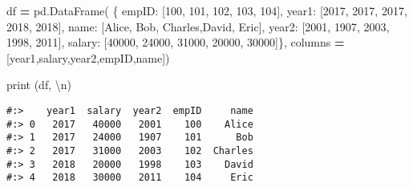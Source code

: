 \documentclass[
]{book}
\newenvironment{Shaded}{\begin{snugshade}}{\end{snugshade}}
\newcommand{\BuiltInTok}[1]{#1}
\newcommand{\CharTok}[1]{\textcolor[rgb]{0.5,0.5,0.5}{#1}}
\newcommand{\DecValTok}[1]{\textcolor[rgb]{0.06,0.06,0.06}{#1}}
\newcommand{\NormalTok}[1]{#1}
\newcommand{\OperatorTok}[1]{\textcolor[rgb]{0.43,0.43,0.43}{\textbf{#1}}}
\newcommand{\StringTok}[1]{\textcolor[rgb]{0.5,0.5,0.5}{#1}}
\begin{document}
\begin{Shaded}
\begin{Highlighting}[]
\NormalTok{df }\OperatorTok{=}\NormalTok{ pd.DataFrame(}
\NormalTok{    \{ }\StringTok{\textquotesingle{}empID\textquotesingle{}}\NormalTok{:  [}\DecValTok{100}\NormalTok{,      }\DecValTok{101}\NormalTok{,    }\DecValTok{102}\NormalTok{,      }\DecValTok{103}\NormalTok{,     }\DecValTok{104}\NormalTok{],}
      \StringTok{\textquotesingle{}year1\textquotesingle{}}\NormalTok{:   [}\DecValTok{2017}\NormalTok{,     }\DecValTok{2017}\NormalTok{,   }\DecValTok{2017}\NormalTok{,      }\DecValTok{2018}\NormalTok{,    }\DecValTok{2018}\NormalTok{],}
      \StringTok{\textquotesingle{}name\textquotesingle{}}\NormalTok{:   [}\StringTok{\textquotesingle{}Alice\textquotesingle{}}\NormalTok{,  }\StringTok{\textquotesingle{}Bob\textquotesingle{}}\NormalTok{,  }\StringTok{\textquotesingle{}Charles\textquotesingle{}}\NormalTok{,}\StringTok{\textquotesingle{}David\textquotesingle{}}\NormalTok{, }\StringTok{\textquotesingle{}Eric\textquotesingle{}}\NormalTok{],}
      \StringTok{\textquotesingle{}year2\textquotesingle{}}\NormalTok{:   [}\DecValTok{2001}\NormalTok{,     }\DecValTok{1907}\NormalTok{,   }\DecValTok{2003}\NormalTok{,      }\DecValTok{1998}\NormalTok{,    }\DecValTok{2011}\NormalTok{],}
      \StringTok{\textquotesingle{}salary\textquotesingle{}}\NormalTok{: [}\DecValTok{40000}\NormalTok{,    }\DecValTok{24000}\NormalTok{,  }\DecValTok{31000}\NormalTok{,     }\DecValTok{20000}\NormalTok{,   }\DecValTok{30000}\NormalTok{]\},}
\NormalTok{    columns }\OperatorTok{=}\NormalTok{ [}\StringTok{\textquotesingle{}year1\textquotesingle{}}\NormalTok{,}\StringTok{\textquotesingle{}salary\textquotesingle{}}\NormalTok{,}\StringTok{\textquotesingle{}year2\textquotesingle{}}\NormalTok{,}\StringTok{\textquotesingle{}empID\textquotesingle{}}\NormalTok{,}\StringTok{\textquotesingle{}name\textquotesingle{}}\NormalTok{])}

\BuiltInTok{print}\NormalTok{ (df, }\StringTok{\textquotesingle{}}\CharTok{\textbackslash{}n}\StringTok{\textquotesingle{}}\NormalTok{)}
\end{Highlighting}
\end{Shaded}

\begin{verbatim}
#:>    year1  salary  year2  empID     name
#:> 0   2017   40000   2001    100    Alice
#:> 1   2017   24000   1907    101      Bob
#:> 2   2017   31000   2003    102  Charles
#:> 3   2018   20000   1998    103    David
#:> 4   2018   30000   2011    104     Eric
\end{verbatim}
\end{document}
